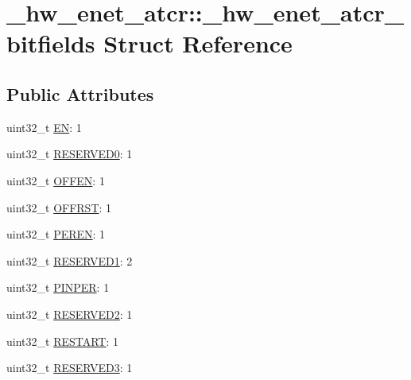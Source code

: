 \hypertarget{struct__hw__enet__atcr_1_1__hw__enet__atcr__bitfields}{}\section{\+\_\+hw\+\_\+enet\+\_\+atcr\+:\+:\+\_\+hw\+\_\+enet\+\_\+atcr\+\_\+bitfields Struct Reference}
\label{struct__hw__enet__atcr_1_1__hw__enet__atcr__bitfields}
\subsection*{Public Attributes}
\begin{DoxyCompactItemize}
\item 
uint32\+\_\+t \hyperlink{struct__hw__enet__atcr_1_1__hw__enet__atcr__bitfields_a5eef6d3710dc498176062a10e95ed28d}{EN}\+: 1
\item 
uint32\+\_\+t \hyperlink{struct__hw__enet__atcr_1_1__hw__enet__atcr__bitfields_a63d30e7e64a0b154a882217015689f85}{R\+E\+S\+E\+R\+V\+E\+D0}\+: 1
\item 
uint32\+\_\+t \hyperlink{struct__hw__enet__atcr_1_1__hw__enet__atcr__bitfields_af499ef57a98ead2eb165e8f27b4f9c4a}{O\+F\+F\+EN}\+: 1
\item 
uint32\+\_\+t \hyperlink{struct__hw__enet__atcr_1_1__hw__enet__atcr__bitfields_ad62c1c1f6f93e6965a8e76d54ac46cd8}{O\+F\+F\+R\+ST}\+: 1
\item 
uint32\+\_\+t \hyperlink{struct__hw__enet__atcr_1_1__hw__enet__atcr__bitfields_a87783f176de9b1d6de88ea2a03733fd7}{P\+E\+R\+EN}\+: 1
\item 
uint32\+\_\+t \hyperlink{struct__hw__enet__atcr_1_1__hw__enet__atcr__bitfields_ade9d3f7d3edb617880296149ac36b947}{R\+E\+S\+E\+R\+V\+E\+D1}\+: 2
\item 
uint32\+\_\+t \hyperlink{struct__hw__enet__atcr_1_1__hw__enet__atcr__bitfields_aa5904365345840f2c5a02190ba714c50}{P\+I\+N\+P\+ER}\+: 1
\item 
uint32\+\_\+t \hyperlink{struct__hw__enet__atcr_1_1__hw__enet__atcr__bitfields_ac3dfe8f99ac296824d6eba462c8fdf91}{R\+E\+S\+E\+R\+V\+E\+D2}\+: 1
\item 
uint32\+\_\+t \hyperlink{struct__hw__enet__atcr_1_1__hw__enet__atcr__bitfields_ad61e46f76a1e49e84b897a10fe9319e8}{R\+E\+S\+T\+A\+RT}\+: 1
\item 
uint32\+\_\+t \hyperlink{struct__hw__enet__atcr_1_1__hw__enet__atcr__bitfields_a019f6449f1db3dae90a0d9d835d1a858}{R\+E\+S\+E\+R\+V\+E\+D3}\+: 1

\end{DoxyCompactItemize}
